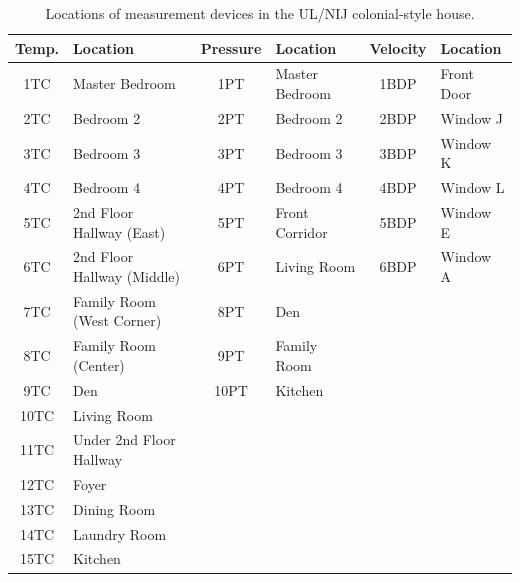 \begin{table}[ht!]
\begin{center}
\begin{tabular}{|c|l||c|l||c|l|}
\hline
Temp.              & Location                & Pressure             & Location          & Velocity              & Location       \\ \hline \hline
1TC              & Master Bedroom          & 1PT                & Master Bedroom    & 1BDP                & Front Door    \\ \hline
2TC              & Bedroom 2             & 2PT                & Bedroom 2       & 2BDP                & Window J       \\ \hline
3TC              & Bedroom 3             & 3PT                & Bedroom 3       & 3BDP                & Window K       \\ \hline
4TC              & Bedroom 4             & 4PT                & Bedroom 4       & 4BDP                & Window L       \\ \hline
5TC              & 2nd Floor Hallway (East)    & 5PT                & Front Corridor    & 5BDP                & Window E       \\ \hline
6TC              & 2nd Floor Hallway (Middle)& 6PT                & Living Room       & 6BDP                & Window A       \\ \hline
7TC              & Family Room (West Corner)   & 8PT                & Den             & \multicolumn{2}{r|}{}              \\ \cline{1-4}
8TC              & Family Room (Center)       & 9PT                & Family Room       & \multicolumn{2}{r|}{}              \\ \cline{1-4}
9TC              & Den                   & 10PT                & Kitchen          & \multicolumn{2}{r|}{}             \\ \cline{1-4}
10TC             & Living Room             & \multicolumn{4}{r|}{}                                                 \\ \cline{1-2}
11TC              & Under 2nd Floor Hallway    & \multicolumn{4}{r|}{}                                              \\ \cline{1-2}
12TC              & Foyer                & \multicolumn{4}{r|}{}                                               \\ \cline{1-2}
13TC              & Dining Room             & \multicolumn{4}{r|}{}                                               \\ \cline{1-2}
14TC              & Laundry Room             & \multicolumn{4}{r|}{}                                               \\ \cline{1-2}
15TC              & Kitchen                & \multicolumn{4}{r|}{}                                               \\ \hline
\end{tabular}
\end{center}
\caption[Locations of measurement devices in the UL/NIJ colonial-style house]
{Locations of measurement devices in the UL/NIJ colonial-style house.}
\label{Colonial_devices}
\end{table}

